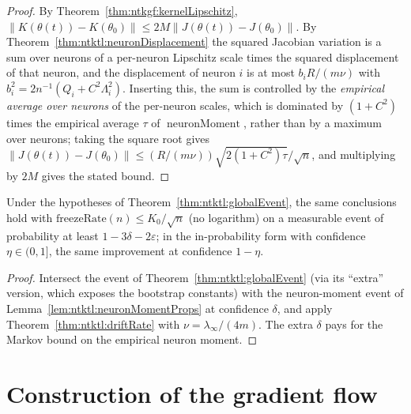 \begin{proof}
  \leanok
By Theorem~\ref{thm:ntkgf:kernelLipschitz}, $\|K(\theta(t))-K(\theta_0)\|\le2M\|J(\theta(t))-J(\theta_0)\|$. By Theorem~\ref{thm:ntktl:neuronDisplacement} the squared Jacobian variation is a sum over neurons of a per-neuron Lipschitz scale times the squared displacement of that neuron, and the displacement of neuron $i$ is at most $b_iR/(m\nu)$ with $b_i^2=2n^{-1}(Q_i+C^2\Lambda_i^2)$.
Inserting this, the sum is controlled by the \emph{empirical average over neurons} of the per-neuron scales, which is dominated by $(1+C^2)$ times the empirical average $\tau$ of $\operatorname{neuronMoment}$, rather than by a maximum over neurons; taking the square root gives $\|J(\theta(t))-J(\theta_0)\|\le(R/(m\nu))\sqrt{2(1+C^2)\tau}/\sqrt n$, and multiplying by $2M$ gives the stated bound.
\end{proof}

\begin{theorem}\label{thm:ntktl:globalEventInvSqrt}
  \leanok
Under the hypotheses of Theorem~\ref{thm:ntktl:globalEvent}, the same conclusions hold with $\mathrm{freezeRate}(n)\le K_0/\sqrt n$ (no logarithm) on a measurable event of probability at least $1-3\delta-2\varepsilon$; in the in-probability form with confidence $\eta\in(0,1]$, the same improvement at confidence $1-\eta$.
\end{theorem}

\begin{proof}
  \leanok
Intersect the event of Theorem~\ref{thm:ntktl:globalEvent} (via its ``extra'' version, which exposes the bootstrap constants) with the neuron-moment event of Lemma~\ref{lem:ntktl:neuronMomentProps} at confidence $\delta$, and apply Theorem~\ref{thm:ntktl:driftRate} with $\nu=\lambda_\infty/(4m)$.
The extra $\delta$ pays for the Markov bound on the empirical neuron moment.
\end{proof}


\section{Construction of the gradient flow}\label{sec:ntktl:flow}


